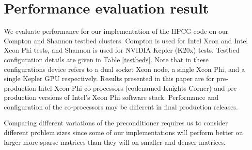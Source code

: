 \documentclass{ccr15}
\begin{document}
\section{Performance evaluation result}
We evaluate performance for our implementation of the HPCG code on our Compton and Shannon testbed clusters. Compton is used for Intel Xeon and Intel Xeon Phi tests, and Shannon is used for NVIDIA Kepler (K20x) tests. Testbed configuration details are given in Table \ref{testbeds}. Note that in these configurations device refers to a dual socket Xeon node, a single Xeon Phi, and a single Kepler GPU respectively.
Results presented in this paper are for pre-production Intel Xeon Phi co-processors (codenamed Knights Corner) and pre-production versions of Intel{'}s Xeon Phi software stack. Performance and configuration of the co-processors may be different in final production releases.

\begin{table}[h]
\centering
{}
 \caption{Configurations of testbed clusters}
 \label{testbeds}
\end{table}

Comparing different variations of the preconditioner requires us to consider different problem sizes
since some of our implementations will perform better on larger more sparse matrices than they will
on smaller and denser matrices. 
\end{document}
